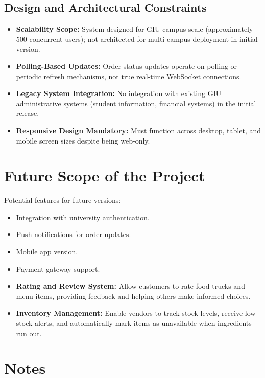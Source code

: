 \documentclass[12pt,a4paper]{article}
\begin{document}
\subsection{Design and Architectural Constraints}
\begin{itemize}[leftmargin=2em, itemsep=8pt]
    \item \textbf{Scalability Scope:} System designed for GIU campus scale (approximately 500 concurrent users); not architected for multi-campus deployment in initial version.
    \item \textbf{Polling-Based Updates:} Order status updates operate on polling or periodic refresh mechanisms, not true real-time WebSocket connections.
    \item \textbf{Legacy System Integration:} No integration with existing GIU administrative systems (student information, financial systems) in the initial release.
    \item \textbf{Responsive Design Mandatory:} Must function across desktop, tablet, and mobile screen sizes despite being web-only.
\end{itemize}

\newpage

\section{Future Scope of the Project}
Potential features for future versions:
\begin{itemize}[leftmargin=2em, itemsep=8pt]
    \item Integration with university authentication.
    \item Push notifications for order updates.
    \item Mobile app version.
    \item Payment gateway support.
    \item \textbf{Rating and Review System:} Allow customers to rate food trucks and menu items, providing feedback and helping others make informed choices.
    \item \textbf{Inventory Management:} Enable vendors to track stock levels, receive low-stock alerts, and automatically mark items as unavailable when ingredients run out.
\end{itemize}

\newpage

\section*{Notes}
\end{document}
